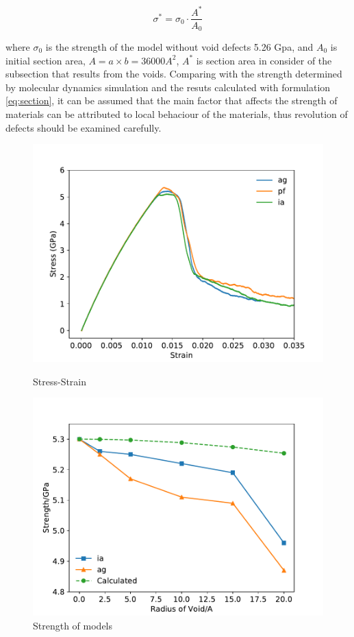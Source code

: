 \documentclass[journal,article,submit,moreauthors,pdftex,10pt,a4paper]{Definitions/mdpi}
\begin{document}
	\begin{equation} \label{eq:section} 
	\sigma^* = \sigma_0 \cdot \frac{A^*}{A_0}
	\end{equation}
	
where $\sigma_0$ is the strength of the model without void defects 5.26 Gpa, and $A_0$ is initial section area, $ A = a\times b = 36000 A^2$, $A^* $ is section area in consider of the subsection that results from the voids. Comparing with the strength determined by molecular dynamics simulation and the resuts calculated with formulation \ref{eq:section}, it can be assumed that the main factor that affects the strength of materials can be attributed to local behaciour of the materials, thus revolution of defects should be examined carefully.
	
	\begin{figure}[h]
		\centering
		\begin{minipage}{0.495\textwidth}
			\includegraphics[width=1\linewidth]{img/allline}
			\centering
			\caption{Stress-Strain}
			\label{fig:stress&strain}
		\end{minipage}	
		\hfill
		\begin{minipage}{0.495\textwidth}		
			\includegraphics[width=1\linewidth]{img/effect_of_vol}
			\centering
			\caption{Strength of models}
			\label{fig:strength}
		\end{minipage}
	\end{figure}
	
\end{document}
